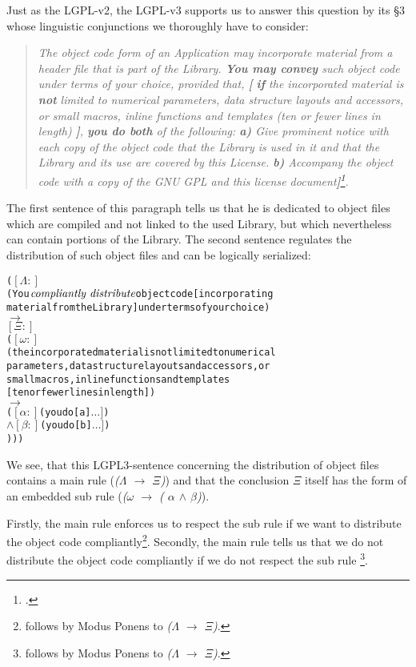 Just as the LGPL-v2, the LGPL-v3 supports us to answer this question by its §3
whose linguistic conjunctions we thoroughly have to consider:

\begin{quote}\emph{The object code form of an Application may incorporate
material from a header file that is part of the Library. \textbf{You may convey}
such object code under terms of your choice, \emph{provided that}, \textbf{[}
\textbf{if} the incorporated material is \textbf{not} limited to numerical
parameters, data structure layouts and accessors, or small macros, inline
functions and templates (ten or fewer lines in length) \textbf{]}, \textbf{you
do both} of the following: \textbf{a)} Give prominent notice with each copy of
the object code that the Library is used in it and that the Library and its use
are covered by this License. \textbf{b)} Accompany the object code with a copy
of the GNU GPL and this license document\textbf{]}\footcite[cf.][\nopage wp.,
§3; emphasis and additional braces KR.]{Lgpl30OsiLicense2007a}.}
\end{quote}

The first sentence of this paragraph tells us that he is dedicated to object
files which are compiled and not linked to the used Library, but which
nevertheless can contain portions of the Library. The second sentence regulates
the distribution of such object files and can be logically serialized:

\begin{alltt}
( \([\Lambda:]\)
  ( You \(\emph{compliantly distribute}\) object code [incorporating 
    material from the Library] under terms of your choice ) 
  \(\rightarrow\)  
  \([\Xi:]\)
  ( \([\omega:]\)
    ( the incorporated material is not limited to numerical
      parameters, data structure layouts and accessors, or 
      small macros, inline functions and templates 
      [ten or fewer lines in length] ) 
    \(\rightarrow\) 
    ( \([\alpha:]\) ( you do [a] \(\ldots]\) )
    \(\wedge\) \([\beta:]\) ( you do [b] \(\ldots]\) )
) ) )
\end{alltt}  

We see, that this LGPL3-sentence concerning the distribution of object files
contains a main rule (\emph{($\Lambda$ $\rightarrow$ $\Xi$)}) and that the
conclusion $\Xi$ itself has the form of an embedded sub rule (\emph{($\omega$
$\rightarrow$ ( $\alpha$ $\wedge$ $\beta$)}).

Firstly, the main rule enforces us to respect the sub rule if we want to
distribute the object code compliantly\footnote{follows by Modus Ponens to
\emph{($\Lambda$ $\rightarrow$ $\Xi$)}.}. Secondly, the main rule tells us that
we do not distribute the object code compliantly if we do not respect the sub
rule \footnote{follows by Modus Ponens to \emph{($\Lambda$ $\rightarrow$
$\Xi$)}.}.

